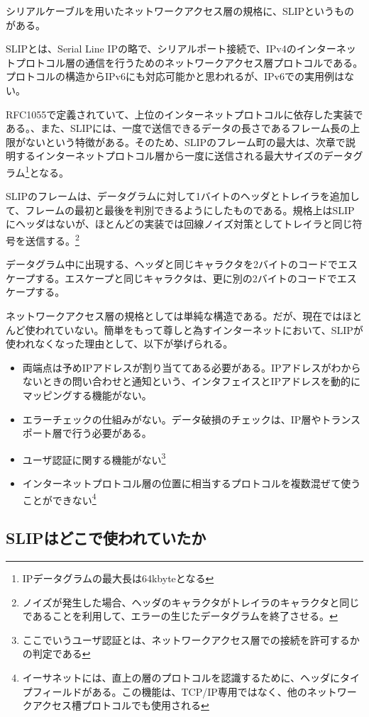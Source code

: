 シリアルケーブルを用いたネットワークアクセス層の規格に、SLIPというものがある。

SLIPとは、Serial Line IPの略で、シリアルポート接続で、IPv4のインターネットプロトコル層の通信を行うためのネットワークアクセス層プロトコルである。プロトコルの構造からIPv6にも対応可能かと思われるが、IPv6での実用例はない。

RFC1055で定義されていて、上位のインターネットプロトコルに依存した実装である。、また、SLIPには、一度で送信できるデータの長さであるフレーム長の上限がないという特徴がある。そのため、SLIPのフレーム町の最大は、次章で説明するインターネットプロトコル層から一度に送信される最大サイズのデータグラム\footnote{IPデータグラムの最大長は64kbyteとなる}となる。

SLIPのフレームは、データグラムに対して1バイトのヘッダとトレイラを追加して、フレームの最初と最後を判別できるようにしたものである。規格上はSLIPにヘッダはないが、ほとんどの実装では回線ノイズ対策としてトレイラと同じ符号を送信する。\footnote{ノイズが発生した場合、ヘッダのキャラクタがトレイラのキャラクタと同じであることを利用して、エラーの生じたデータグラムを終了させる。}

データグラム中に出現する、ヘッダと同じキャラクタを2バイトのコードでエスケープする。エスケープと同じキャラクタは、更に別の2バイトのコードでエスケープする。

ネットワークアクセス層の規格としては単純な構造である。だが、現在ではほとんど使われていない。簡単をもって尊しと為すインターネットにおいて、SLIPが使われなくなった理由として、以下が挙げられる。

\begin{itemize}
\item 両端点は予めIPアドレスが割り当ててある必要がある。IPアドレスがわからないときの問い合わせと通知という、インタフェイスとIPアドレスを動的にマッピングする機能がない。
\item エラーチェックの仕組みがない。データ破損のチェックは、IP層やトランスポート層で行う必要がある。
\item ユーザ認証に関する機能がない\footnote{ここでいうユーザ認証とは、ネットワークアクセス層での接続を許可するかの判定である}
\item インターネットプロトコル層の位置に相当するプロトコルを複数混ぜて使うことができない\footnote{イーサネットには、直上の層のプロトコルを認識するために、ヘッダにタイプフィールドがある。この機能は、TCP/IP専用ではなく、他のネットワークアクセス槽プロトコルでも使用される}
\end{itemize}

\subsection{SLIPはどこで使われていたか}

